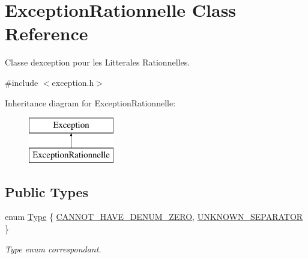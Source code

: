 \hypertarget{class_exception_rationnelle}{}\section{Exception\+Rationnelle Class Reference}
\label{class_exception_rationnelle}


Classe d\textquotesingle{}exception pour les Litterales Rationnelles.  




{\ttfamily \#include $<$exception.\+h$>$}

Inheritance diagram for Exception\+Rationnelle\+:\begin{figure}[H]
\begin{center}
\leavevmode
\includegraphics[height=2.000000cm]{class_exception_rationnelle}
\end{center}
\end{figure}
\subsection*{Public Types}
\begin{DoxyCompactItemize}
\item 
enum \hyperlink{class_exception_rationnelle_ac394933986da15ec9b40db3d46c32887}{Type} \{ \hyperlink{class_exception_rationnelle_ac394933986da15ec9b40db3d46c32887ae3c5fa15bcea676f55a4fcce0ae51a91}{C\+A\+N\+N\+O\+T\+\_\+\+H\+A\+V\+E\+\_\+\+D\+E\+N\+U\+M\+\_\+\+Z\+E\+RO}, 
\hyperlink{class_exception_rationnelle_ac394933986da15ec9b40db3d46c32887a31e2f21aee48d4ad850974bcfc7530a3}{U\+N\+K\+N\+O\+W\+N\+\_\+\+S\+E\+P\+A\+R\+A\+T\+OR}
 \}\begin{DoxyCompactList}\small\item\em Type enum correspondant. \end{DoxyCompactList}
\end{DoxyCompactItemize}
